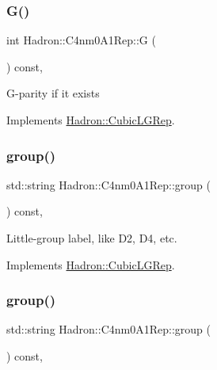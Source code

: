 \subsubsection{\texorpdfstring{G()}{G()}\hspace{0.1cm}{\footnotesize\ttfamily [2/2]}}
{\footnotesize\ttfamily int Hadron\+::\+C4nm0\+A1\+Rep\+::G (\begin{DoxyParamCaption}{ }\end{DoxyParamCaption}) const\hspace{0.3cm}{\ttfamily [inline]}, {\ttfamily [virtual]}}

G-\/parity if it exists 

Implements \mbox{\hyperlink{structHadron_1_1CubicLGRep_ace26f7b2d55e3a668a14cb9026da5231}{Hadron\+::\+Cubic\+L\+G\+Rep}}.

\mbox{\label{structHadron_1_1C4nm0A1Rep_a8a1fbd6d906d95cd3fa74bac06176aaa}} 
\subsubsection{\texorpdfstring{group()}{group()}\hspace{0.1cm}{\footnotesize\ttfamily [1/3]}}
{\footnotesize\ttfamily std\+::string Hadron\+::\+C4nm0\+A1\+Rep\+::group (\begin{DoxyParamCaption}{ }\end{DoxyParamCaption}) const\hspace{0.3cm}{\ttfamily [inline]}, {\ttfamily [virtual]}}

Little-\/group label, like D2, D4, etc. 

Implements \mbox{\hyperlink{structHadron_1_1CubicLGRep_a9bdb14b519a611d21379ed96a3a9eb41}{Hadron\+::\+Cubic\+L\+G\+Rep}}.

\mbox{\label{structHadron_1_1C4nm0A1Rep_a8a1fbd6d906d95cd3fa74bac06176aaa}} 
\subsubsection{\texorpdfstring{group()}{group()}\hspace{0.1cm}{\footnotesize\ttfamily [2/3]}}
{\footnotesize\ttfamily std\+::string Hadron\+::\+C4nm0\+A1\+Rep\+::group (\begin{DoxyParamCaption}{ }\end{DoxyParamCaption}) const\hspace{0.3cm}{\ttfamily [inline]}, {\ttfamily [virtual]}}

